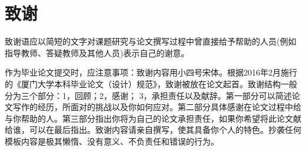 
\chapter*{致谢} 

致谢语应以简短的文字对课题研究与论文撰写过程中曾直接给予帮助的人员(例如指导教师、答疑教师及其他人员)表示自己的谢意。

作为毕业论文提交时，应注意事项：致谢内容用小四号宋体。根据2016年2月施行的《厦门大学本科毕业论文（设计）规范》，致谢被放在论文起首。致谢结构一般分为三个部分：1，回顾；2，感谢； 3，承担责任以及献辞。第一部分可以简述论文写作的经历，所面对的挑战以及你如何应对。第二部分具体感谢在论文过程中给与你帮助的人。第三部分指出你将为自己的论文承担责任，如果你希望将此论文献给谁，可以在最后指出。致谢内容请亲自撰写，使其具备你个人的特色。抄袭任何模板内容是极其懒惰、没有意义、不负责任和错误的行为。
